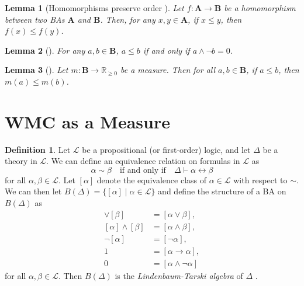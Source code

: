 \documentclass{article}
\newtheorem{lemma}{Lemma}
\theoremstyle{definition}
\newtheorem{definition}{Definition}
\theoremstyle{remark}
\begin{document}
\begin{lemma}[Homomorphisms preserve order
  \cite{givant2008introduction}] \label{lemma:homomorphisms_and_order}
  Let $f\colon \mathbf{A} \to \mathbf{B}$ be a homomorphism between two BAs
  $\mathbf{A}$ and $\mathbf{B}$. Then, for any $x, y \in \mathbf{A}$, if $x \le
  y$, then $f(x) \le f(y)$.
\end{lemma}

\begin{lemma}[\cite{sikorski1969boolean}] \label{lemma:order}
  For any $a, b \in \mathbf{B}$, $a \le b$ if and only if $a \land \neg b = 0$.
\end{lemma}

\begin{lemma}[\cite{givant2008introduction}] \label{lemma:measure_and_order}
  Let $m\colon \mathbf{B} \to \mathbb{R}_{\ge 0}$ be a measure. Then for all $a,
  b \in \mathbf{B}$, if $a \le b$, then $m(a) \le m(b)$.
\end{lemma}



\section{WMC as a Measure}


\begin{definition} \label{def:algebra_from_logic}
  Let $\mathcal{L}$ be a propositional (or first-order) logic, and let
  $\Delta$ be a theory in $\mathcal{L}$. We can define an equivalence
  relation on formulas in $\mathcal{L}$ as
  \[
    \alpha \sim \beta \quad \text{if and only if} \quad \Delta \vdash \alpha
    \leftrightarrow \beta
  \]
  for all $\alpha, \beta \in \mathcal{L}$. Let $[\alpha]$ denote the equivalence
  class of $\alpha \in \mathcal{L}$ with respect to $\sim$. We can then let
  $B(\Delta) = \{ [\alpha] \mid \alpha \in \mathcal{L} \}$ and define the
  structure of a BA on $B(\Delta)$ as
  \begin{align*}
    [\alpha] \lor [\beta] &= [\alpha \lor \beta], \\
    [\alpha] \land [\beta] &= [\alpha \land \beta], \\
    \neg[\alpha] &= [\neg\alpha], \\
    1 &= [\alpha \to \alpha], \\
    0 &= [\alpha \land \neg\alpha]
  \end{align*}
  for all $\alpha, \beta \in \mathcal{L}$. Then $B(\Delta)$ is the
  \emph{Lindenbaum-Tarski algebra} of $\Delta$
  \cite{koppelberg1989handbook,tarski1983logic}.
\end{definition}
\end{document}
